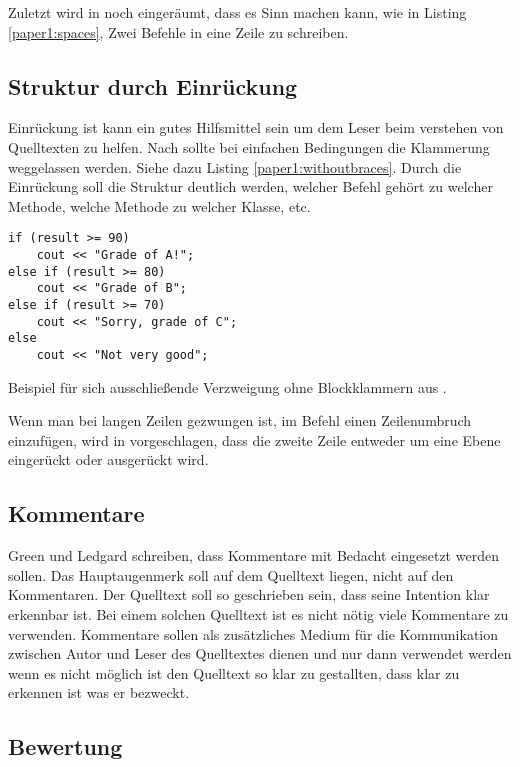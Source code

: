Zuletzt wird in \cite{Green} noch eingeräumt, dass es Sinn machen kann, wie in Listing \ref{paper1:spaces}, Zwei Befehle in eine Zeile zu schreiben.

\subsection{Struktur durch Einrückung}
Einrückung ist kann ein gutes Hilfsmittel sein um dem Leser beim verstehen von Quelltexten zu helfen. Nach \cite[S. 8]{Green} sollte bei einfachen Bedingungen die Klammerung weggelassen werden. Siehe dazu Listing \ref{paper1:withoutbraces}. Durch die Einrückung soll die Struktur deutlich werden, welcher Befehl gehört zu welcher Methode, welche Methode zu welcher Klasse, etc.

\begin{listing}[H]
    \begin{verbatim}
if (result >= 90)
    cout << "Grade of A!";
else if (result >= 80)
    cout << "Grade of B";
else if (result >= 70)
    cout << "Sorry, grade of C";
else
    cout << "Not very good";
    \end{verbatim}
    \label{paper1:withoutbraces}
    \caption{Beispiel für sich ausschließende Verzweigung ohne Blockklammern aus \cite[S. 8]{Green}.}
\end{listing}

Wenn man bei langen Zeilen gezwungen ist, im Befehl einen Zeilenumbruch einzufügen, wird in \cite[S. 3]{Green} vorgeschlagen, dass die zweite Zeile entweder um eine Ebene eingerückt oder ausgerückt wird.

\subsection{Kommentare}
Green und Ledgard schreiben, dass Kommentare mit Bedacht eingesetzt werden sollen. Das Hauptaugenmerk soll auf dem Quelltext liegen, nicht auf den Kommentaren. Der Quelltext soll so geschrieben sein, dass seine Intention klar erkennbar ist. Bei einem solchen Quelltext ist es nicht nötig viele Kommentare zu verwenden. Kommentare sollen als zusätzliches Medium für die Kommunikation zwischen Autor und Leser des Quelltextes dienen und nur dann verwendet werden wenn es nicht möglich ist den Quelltext so klar zu gestallten, dass klar zu erkennen ist was er bezweckt. \cite[S. 9]{Green}


\subsection{Bewertung}

